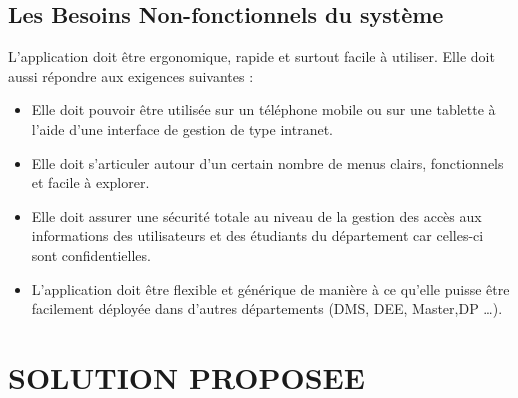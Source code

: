 \documentclass[overfullbox]{polytech/polytech}
\begin{document}
\subsection{Les Besoins Non-fonctionnels du système}
L’application doit être ergonomique, rapide et surtout facile à utiliser. Elle doit aussi répondre aux exigences suivantes :
\begin{itemize}
	\item Elle doit pouvoir être utilisée sur un téléphone mobile ou sur une tablette à l’aide d’une interface de gestion de type intranet.
   \item Elle doit s’articuler autour d’un certain nombre de menus clairs, fonctionnels et facile à explorer.
   \item Elle doit assurer une sécurité totale au niveau de la gestion des accès aux informations des utilisateurs et des étudiants du département car celles-ci sont confidentielles.
   \item L’application doit être flexible et générique  de manière à ce qu'elle puisse être facilement déployée dans d’autres départements (DMS, DEE, Master,DP …).
 \end{itemize}

\section{SOLUTION PROPOSEE}
\end{document}
